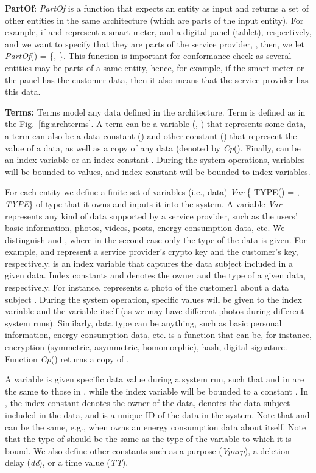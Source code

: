 \documentclass[a4paper]{article}
\begin{document}
\textbf{PartOf}: \textit{PartOf} is a function that expects an entity as input and returns a set of other entities in the same architecture (which are parts of the input entity). For example, if  and  represent a smart meter, and a digital panel (tablet), respectively, and we want to specify that they are parts of the service provider, , then, we let \textit{PartOf}() = \{, \}. This function is important for conformance check as several entities may be parts of a same entity, hence, for example, if the smart meter or the panel has the customer data, then it also means that the service provider has this data. 

\textbf{Terms:} Terms model any data defined in the architecture. Term  is defined as in the Fig.~\ref{fig:archterms}.  A term can be a variable (, ) that represents some data, a term can also be a data constant () and other constant () that represent the value of a data,  as well as  a copy of any data  (denoted by \textit{Cp}(). Finally,  can be an index variable  or an index constant . During the system operations,  variables will be bounded to values, and index constant will be bounded to index variables. 

For each entity  we define a finite set of variables (i.e., data) \textit{Var}  \{  TYPE() = ,   \textit{TYPE}\} of type  that it owns and inputs it into the system.    
A variable   \textit{Var} represents any kind of data supported by a service provider, such as the users' basic information, photos, videos, posts, energy consumption data, etc. We distinguish  and , where in the second case only the type of the data is given. For example,  and  represent a service provider's crypto key and the customer's key, respectively.  is an index variable that captures the data subject included in a given data. Index constants  and  denotes the owner and the type of a given data, respectively. For instance,  represents a photo of the  customer1 about a data subject . During the system operation, specific values will be given to the index variable  and the variable  itself  (as we may have different photos during different system runs). Similarly, data type can be anything, such as basic personal information, energy consumption data, etc.  is a function that can be, for instance, encryption (symmetric,  asymmetric, homomorphic), hash, digital signature. Function \textit{Cp}() returns a copy of .
 
A variable   is given specific data value  during a system run, such that  and   in  are the same to those in , while the index variable  will be bounded to a constant . In , the index constant  denotes the owner of the data,  denotes the data subject included in the data, and  is a unique ID of the data in the system.  Note that  and  can be the same, e.g., when  owns an energy consumption data about itself. Note that the type of  should be the same as   the type of the variable to which it is bound. We also define other constants such as a purpose (\textit{Vpurp}), a deletion delay (\textit{dd}), or a time value (\textit{TT}). 
\end{document}
